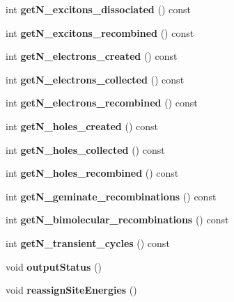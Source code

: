 \begin{DoxyCompactItemize}
\item 
\mbox{\label{class_o_s_c___sim_ad4e1d01074aa99ab83a86caf102ed1f0}} 
int {\bfseries get\+N\+\_\+excitons\+\_\+dissociated} () const
\item 
\mbox{\label{class_o_s_c___sim_af4b5988d7867fd1d6d297768c758d984}} 
int {\bfseries get\+N\+\_\+excitons\+\_\+recombined} () const
\item 
\mbox{\label{class_o_s_c___sim_aadb3c72821bac6153f0f848ce1a87c2b}} 
int {\bfseries get\+N\+\_\+electrons\+\_\+created} () const
\item 
\mbox{\label{class_o_s_c___sim_abb8a9aefba0cb189fbaeba0f9bdff180}} 
int {\bfseries get\+N\+\_\+electrons\+\_\+collected} () const
\item 
\mbox{\label{class_o_s_c___sim_a15b6b1af56c4285252c6102b3672481c}} 
int {\bfseries get\+N\+\_\+electrons\+\_\+recombined} () const
\item 
\mbox{\label{class_o_s_c___sim_ae6bc3f06e216d922075039c6e3f900c9}} 
int {\bfseries get\+N\+\_\+holes\+\_\+created} () const
\item 
\mbox{\label{class_o_s_c___sim_a6809c1bc0b9fd7852621a86eb49457e0}} 
int {\bfseries get\+N\+\_\+holes\+\_\+collected} () const
\item 
\mbox{\label{class_o_s_c___sim_aa6a8cfccbe629cba8ed137e3c205affe}} 
int {\bfseries get\+N\+\_\+holes\+\_\+recombined} () const
\item 
\mbox{\label{class_o_s_c___sim_a152520ae80b5f879578c01c25b9b4a7f}} 
int {\bfseries get\+N\+\_\+geminate\+\_\+recombinations} () const
\item 
\mbox{\label{class_o_s_c___sim_afa814164790477d643fe04fca021483d}} 
int {\bfseries get\+N\+\_\+bimolecular\+\_\+recombinations} () const
\item 
\mbox{\label{class_o_s_c___sim_a0b14455856a684c59ba7d496782b0941}} 
int {\bfseries get\+N\+\_\+transient\+\_\+cycles} () const
\item 
\mbox{\label{class_o_s_c___sim_a78aa9badec9d28169b7b71b29e90c265}} 
void {\bfseries output\+Status} ()
\item 
\mbox{\label{class_o_s_c___sim_a75f8094106ced73efaec99cc302f2aa9}} 
void {\bfseries reassign\+Site\+Energies} ()
\end{DoxyCompactItemize}
